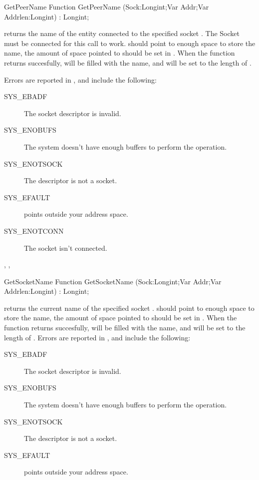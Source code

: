 \begin{function}{GetPeerName}
\Declaration
Function GetPeerName (Sock:Longint;Var Addr;Var Addrlen:Longint) : Longint;

\Description
{} returns the name of the entity connected to the 
specified socket . The Socket must be connected for this call to
work. 
 should point to enough space to store the name, the
amount of space pointed to should be set in . 
When the function returns succesfully,  will be filled with the 
name, and  will be set to the length of .

\Errors
Errors are reported in , and include the following:
\begin{description}
\item[SYS\_EBADF] The socket descriptor is invalid.
\item[SYS\_ENOBUFS] The system doesn't have enough buffers to perform the
operation.
\item[SYS\_ENOTSOCK] The descriptor is not a socket.
\item[SYS\_EFAULT]  points outside your address space.
\item[SYS\_ENOTCONN] The socket isn't connected.
\end{description}

\SeeAlso
{}, , 
\end{function}
\begin{function}{GetSocketName}
\Declaration
Function GetSocketName (Sock:Longint;Var Addr;Var Addrlen:Longint) : Longint;

\Description
{} returns the current name of the specified socket
.  should point to enough space to store the name, the
amount of space pointed to should be set in . 
When the function returns succesfully,  will be filled with the 
name, and  will be set to the length of .
\Errors
Errors are reported in , and include the following:
\begin{description}
\item[SYS\_EBADF] The socket descriptor is invalid.
\item[SYS\_ENOBUFS] The system doesn't have enough buffers to perform the
operation.
\item[SYS\_ENOTSOCK] The descriptor is not a socket.
\item[SYS\_EFAULT]  points outside your address space.
\end{description}

\SeeAlso
{}
\end{function}
